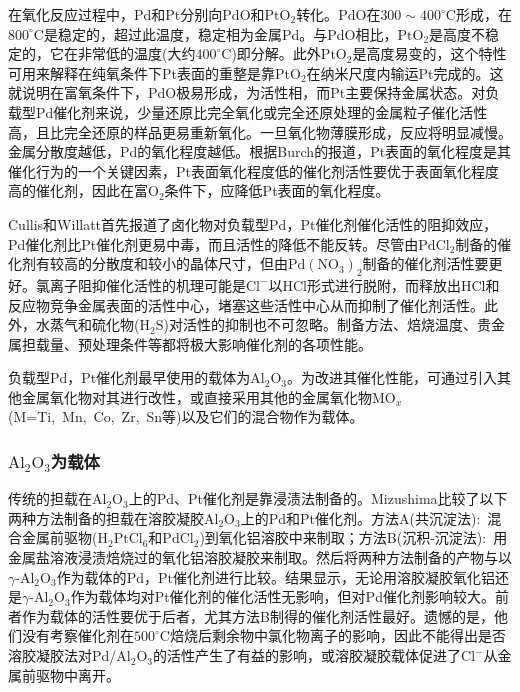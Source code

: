 在氧化反应过程中，\textrm{Pd}和\textrm{Pt}分别向\textrm{PdO}和$\mathrm{PtO}_2$转化。$\mathrm{PdO}$在$300\sim400^{\circ}\mathrm{C}$形成，在$800^{\circ}\mathrm{C}$是稳定的，超过此温度，稳定相为金属\textrm{Pd}。与\textrm{PdO}相比，$\mathrm{PtO}_2$是高度不稳定的，它在非常低的温度(大约$400^{\circ}\mathrm{C}$)即分解。此外$\mathrm{PtO}_2$是高度易变的，这个特性可用来解释在纯氧条件下\textrm{Pt}表面的重整是靠$\mathrm{PtO}_2$在纳米尺度内输运\textrm{Pt}完成的。这就说明在富氧条件下，\textrm{PdO}极易形成，为活性相，而\textrm{Pt}主要保持金属状态。对负载型\textrm{Pd}催化剂来说，少量还原比完全氧化或完全还原处理的金属粒子催化活性高，且比完全还原的样品更易重新氧化\cite{ACA218-197_2001}。一旦氧化物薄膜形成，反应将明显减慢。金属分散度越低，\textrm{Pd}的氧化程度越低。根据\textrm{Burch}的报道\cite{ACB5-149_1994}，\textrm{Pt}表面的氧化程度是其催化行为的一个关键因素，\textrm{Pt}表面氧化程度低的催化剂活性要优于表面氧化程度高的催化剂，因此在富$\mathrm{O}_2$条件下，应降低\textrm{Pt}表面的氧化程度。

\textrm{Cullis}和\textrm{Willatt}\cite{JCatal86-187_1984}首先报道了卤化物对负载型\textrm{Pd}，\textrm{Pt}催化剂催化活性的阻抑效应，\textrm{Pd}催化剂比\textrm{Pt}催化剂更易中毒，而且活性的降低不能反转。尽管由$\mathrm{PdCl}_2$制备的催化剂有较高的分散度和较小的晶体尺寸，但由$\mathrm{Pd}(\mathrm{NO}_3)_2$制备的催化剂活性要更好。氯离子阻抑催化活性的机理\cite{ACA203-37_2000,JC197-394_2001}可能是$\mathrm{Cl}^-$以\textrm{HCl}形式进行脱附，而释放出\textrm{HCl}和反应物竞争金属表面的活性中心，堵塞这些活性中心从而抑制了催化剂活性。此外，水蒸气和硫化物($\mathrm{H}_2\mathrm{S}$)对活性的抑制也不可忽略。制备方法、焙烧温度、贵金属担载量、预处理条件等都将极大影响催化剂的各项性能。

负载型\textrm{Pd}，\textrm{Pt}催化剂最早使用的载体为$\mathrm{Al}_2\mathrm{O}_3$。为改进其催化性能，可通过引入其他金属氧化物对其进行改性，或直接采用其他的金属氧化物$\mathrm{MO}_x$(\textrm{M=Ti,~Mn,~Co,~Zr,~Sn}等)以及它们的混合物作为载体。

\subsubsection{$\mathrm{Al}_2\mathrm{O}_3$为载体}
传统的担载在$\mathrm{Al}_2\mathrm{O}_3$上的\textrm{Pd}、\textrm{Pt}催化剂是靠浸渍法制备的。\textrm{Mizushima}\cite{ACA88-137_1992}比较了以下两种方法制备的担载在溶胶凝胶$\mathrm{Al}_2\mathrm{O}_3$上的\textrm{Pd}和\textrm{Pt}催化剂。方法\textrm{A}(共沉淀法):~混合金属前驱物($\mathrm{H}_2\mathrm{PtCl}_6$和$\mathrm{PdCl}_2$)到氧化铝溶胶中来制取；方法\textrm{B}(沉积-沉淀法):~用金属盐溶液浸渍焙烧过的氧化铝溶胶凝胶来制取。然后将两种方法制备的产物与以$\gamma$-$\mathrm{Al}_2\mathrm{O}_3$作为载体的$\mathrm{Pd}$，$\mathrm{Pt}$催化剂进行比较。结果显示，无论用溶胶凝胶氧化铝还是$\gamma$-$\mathrm{Al}_2\mathrm{O}_3$作为载体均对\textrm{Pt}催化剂的催化活性无影响，但对\textrm{Pd}催化剂影响较大。前者作为载体的活性要优于后者，尤其方法\textrm{B}制得的催化剂活性最好。遗憾的是，他们没有考察催化剂在$500^{\circ}\mathrm{C}$焙烧后剩余物中氯化物离子的影响，因此不能得出是否溶胶凝胶法对\textrm{Pd}/$\mathrm{Al}_2\mathrm{O}_3$的活性产生了有益的影响，或溶胶凝胶载体促进了$\mathrm{Cl}^-$从金属前驱物中离开。

